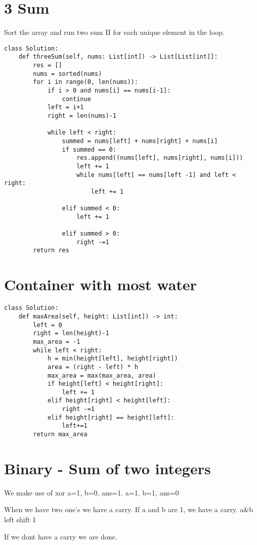\documentclass[24pt, a4]{article}
\begin{document}
\section{3 Sum}
Sort the array and run two sum II for each unique element in the loop.
\begin{lstlisting}
class Solution:
    def threeSum(self, nums: List[int]) -> List[List[int]]:
        res = []
        nums = sorted(nums)
        for i in range(0, len(nums)):
            if i > 0 and nums[i] == nums[i-1]:
                continue
            left = i+1
            right = len(nums)-1
            
            while left < right:
                summed = nums[left] + nums[right] + nums[i]
                if summed == 0:
                    res.append((nums[left], nums[right], nums[i]))
                    left += 1
                    while nums[left] == nums[left -1] and left < right:
                        left += 1
                
                elif summed < 0:
                    left += 1
                
                elif summed > 0:
                    right -=1
        return res
\end{lstlisting}
\section{Container with most water}
\begin{lstlisting}
class Solution:
    def maxArea(self, height: List[int]) -> int:
        left = 0
        right = len(height)-1
        max_area = -1
        while left < right:
            h = min(height[left], height[right])
            area = (right - left) * h
            max_area = max(max_area, area)
            if height[left] < height[right]:
                left += 1
            elif height[right] < height[left]:
                right -=1
            elif height[right] == height[left]:
                left+=1
        return max_area
\end{lstlisting}

\section{Binary - Sum of two integers}
We make use of xor a=1, b=0, ans=1. a=1, b=1, ans=0

When we have two one's we have a carry. If a and b are 1, we have a carry. a\&b left shift 1

If we dont have a carry we are done.
\end{document}
